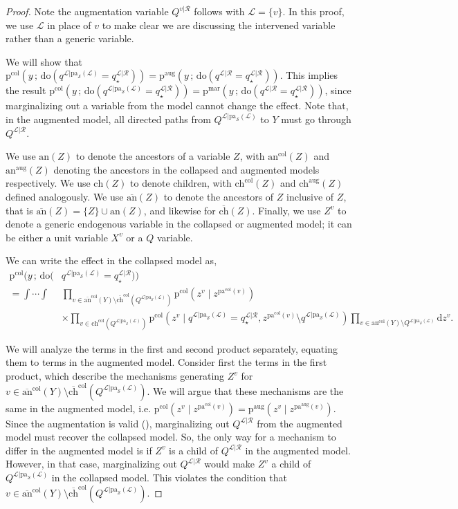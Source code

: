 \documentclass[12pt]{article}
\newcommand{\Sc}{\mathcal{S}}
\newcommand{\rmdo}{\mathrm{do}}
\newcommand{\s}{\, ; \,}
\newcommand{\di}{\mathrm{d}}
\newcommand{\pa}{\mathrm{pa}}
\newcommand{\pr}{\mathrm{p}}
\newcommand{\col}{\mathrm{col}}
\newcommand{\aug}{\mathrm{aug}}
\newcommand{\mar}{\mathrm{mar}}
\newcommand{\QLR}{Q^{\mathcal{L}|\mathcal{R}}}
\newcommand{\QLp}{Q^{\mathcal{L}|\pa_\Sc(\mathcal{L})}}
\newcommand{\qLR}{q^{\mathcal{L}|\mathcal{R}}}
\newcommand{\qLp}{q^{\mathcal{L}|\pa_\Sc(\mathcal{L})}}
\newcommand{\qsLR}{q_\star^{\mathcal{L}|\mathcal{R}}}
\newcommand{\an}{\mathrm{an}}
\newcommand{\ch}{\mathrm{ch}}
\begin{document}
\begin{proof}
	Note the augmentation variable $Q^{v|\mathcal{R}}$ follows  with $\mathcal{L} = \{v\}$. In this proof, we use $\mathcal{L}$ in place of $v$ to make clear we are discussing the intervened variable rather than a generic variable.
	
	We will show that $\pr^\col(y \s \rmdo(\qLp = \qsLR)) = \pr^\aug(y \s \rmdo(\qLR = \qsLR))$. This implies the result $\pr^\col(y \s \rmdo(\qLp = \qsLR)) = \pr^\mar(y \s \rmdo(\qLR = \qsLR))$, since marginalizing out a variable from the model cannot change the effect.
	Note that, in the augmented model, all directed paths from $\QLp$ to $Y$ must go through $\QLR$. 
	
	We use $\an(Z)$ to denote the ancestors of a variable $Z$, with $\an^\col(Z)$ and $\an^\aug(Z)$ denoting the ancestors in the collapsed and augmented models respectively.
	We use $\ch(Z)$ to denote children, with $\ch^\col(Z)$ and $\ch^\aug(Z)$ defined analogously.
	We use $\overline{\an}(Z)$ to denote the ancestors of $Z$ inclusive of $Z$, that is $\overline{\an}(Z) = \{Z\} \cup \an(Z)$, and likewise for $\overline{\ch}(Z)$.
	Finally, we use $Z^v$ to denote a generic endogenous variable in the collapsed or augmented model; it can be either a unit variable $X^v$ or a $Q$ variable. 
	
We can write the effect in the collapsed model as,
\begin{equation*}
\begin{split}
	\pr^\col (y \s \rmdo( &\qLp = \qsLR))\\ = \int \cdots \int & \prod_{v \in \overline{\an}^\col(Y) \setminus \overline{\ch}^\col(\QLp)} \pr^\col(z^v \mid z^{\pa^\col(v)})\\ & \times \prod_{v \in \ch^\col(\QLp)} \pr^\col(z^v \mid \qLp = \qsLR, z^{\pa^\col(v)}\setminus \qLp) \prod_{v \in \an^\col(Y) \setminus \QLp} \di z^v.
\end{split}
\end{equation*}

We will analyze the terms in the first and second product separately, equating them to terms in the augmented model.
Consider first the terms in the first product, which describe the mechanisms generating $Z^v$ for $v \in \overline{\an}^\col(Y) \setminus \overline{\ch}^\col(\QLp)$. 
We will argue that these mechanisms are the same in the augmented model, i.e. $\pr^\col(z^v \mid z^{\pa^\col(v)}) = \pr^\aug(z^v \mid z^{\pa^\aug(v)})$. 
Since the augmentation is valid (), marginalizing out $\QLR$ from the augmented model must recover the collapsed model. So, the only way for a mechanism to differ in the augmented model is if $Z^v$ is a child of $\QLR$ in the augmented model.
However, in that case, marginalizing out $\QLR$ would make $Z^v$ a child of $\QLp$ in the collapsed model. This violates the condition that $v \in \overline{\an}^\col(Y) \setminus \overline{\ch}^\col(\QLp)$.


\end{proof}
\end{document}
